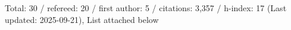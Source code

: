 Total: 30 / refereed: 20 / first author: 5 / citations: 3,357 / h-index: 17 (Last updated: 2025-09-21), List attached below
